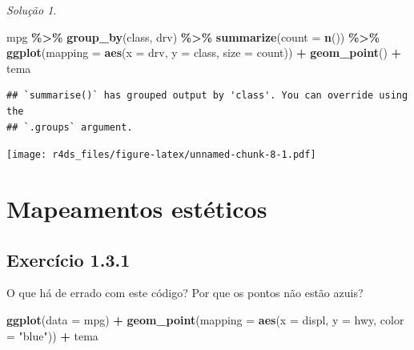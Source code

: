 \documentclass[
]{latex/krantz}
\newenvironment{Shaded}{\begin{snugshade}}{\end{snugshade}}
\newcommand{\AttributeTok}[1]{\textcolor[rgb]{0.13,0.29,0.53}{#1}}
\newcommand{\FunctionTok}[1]{\textcolor[rgb]{0.13,0.29,0.53}{\textbf{#1}}}
\newcommand{\NormalTok}[1]{#1}
\newcommand{\SpecialCharTok}[1]{\textcolor[rgb]{0.81,0.36,0.00}{\textbf{#1}}}
\newcommand{\StringTok}[1]{\textcolor[rgb]{0.31,0.60,0.02}{#1}}
\theoremstyle{definition}
\theoremstyle{definition}
\theoremstyle{definition}
\theoremstyle{definition}
\theoremstyle{remark}
\newtheorem*{solution}{Solução}
\begin{document}
\begin{solution}
\begin{Shaded}
\begin{Highlighting}[]
\NormalTok{mpg }\SpecialCharTok{\%\textgreater{}\%}
    \FunctionTok{group\_by}\NormalTok{(class, drv) }\SpecialCharTok{\%\textgreater{}\%}
    \FunctionTok{summarize}\NormalTok{(}\AttributeTok{count =} \FunctionTok{n}\NormalTok{()) }\SpecialCharTok{\%\textgreater{}\%}
    \FunctionTok{ggplot}\NormalTok{(}\AttributeTok{mapping =} \FunctionTok{aes}\NormalTok{(}\AttributeTok{x =}\NormalTok{ drv, }\AttributeTok{y =}\NormalTok{ class, }\AttributeTok{size =}\NormalTok{ count)) }\SpecialCharTok{+}
        \FunctionTok{geom\_point}\NormalTok{() }\SpecialCharTok{+}
\NormalTok{        tema}
\end{Highlighting}
\end{Shaded}

\begin{verbatim}
## `summarise()` has grouped output by 'class'. You can override using the
## `.groups` argument.
\end{verbatim}

\texttt{[image: r4ds\_files/figure-latex/unnamed-chunk-8-1.pdf]}

\end{solution}

\hypertarget{mapeamentos-estuxe9ticos}{%
\section{Mapeamentos estéticos}\label{mapeamentos-estuxe9ticos}}

\hypertarget{exr1-3-1}{%
\subsection*{Exercício 1.3.1}\label{exr1-3-1}}

O que há de errado com este código? Por que os pontos não estão azuis?

\begin{Shaded}
\begin{Highlighting}[]
\FunctionTok{ggplot}\NormalTok{(}\AttributeTok{data =}\NormalTok{ mpg) }\SpecialCharTok{+}
    \FunctionTok{geom\_point}\NormalTok{(}\AttributeTok{mapping =} \FunctionTok{aes}\NormalTok{(}\AttributeTok{x =}\NormalTok{ displ, }\AttributeTok{y =}\NormalTok{ hwy, }\AttributeTok{color =} \StringTok{"blue"}\NormalTok{)) }\SpecialCharTok{+}
\NormalTok{    tema}
\end{Highlighting}
\end{Shaded}
\end{document}
